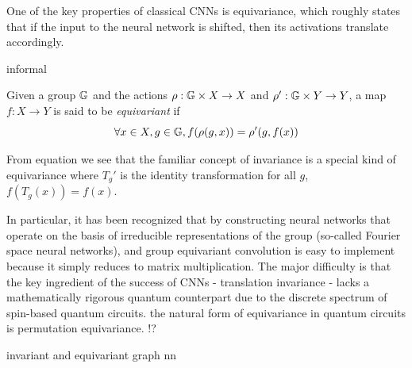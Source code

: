 One of the key properties of classical CNNs is equivariance, which roughly states that if the input to the neural network is shifted, then its activations translate accordingly. 
\cite{cohenGroupEquivariantConvolutional2016}
\cite{kondorCovariantCompositionalNetworks2018}
\begin{definition}[Covariant]
\end{definition}
\begin{definition}[Invariant]
	informal
\end{definition}
\begin{definition}[Equivariant]\label{def:equivariant}
	Given a group $\mathbb{G}$ and the actions $\rho: \mathbb{G} \times X\to X$ and $\rho': \mathbb{G} \times Y\to Y$,
	a map $f: X\to Y$ is said to be \emph{equivariant} if
	\begin{equation}
		\forall x\in X, g\in \mathbb{G},
		f(\rho(g,x)) = \rho'(g,f(x))
	\end{equation}
\end{definition}
From equation  we see that the familiar concept of invariance is a special kind of equivariance where $T_g'$ is the identity transformation for all $g$, $f(T_g(x))=f(x)$.
\begin{remark}
	In particular, it has been recognized that by constructing neural networks that operate on the basis of irreducible representations of the group (so-called Fourier space neural networks), and group equivariant convolution is easy to implement because it simply reduces to matrix multiplication.
	The major difficulty is that the key ingredient of the success of CNNs - translation invariance - lacks a mathematically rigorous quantum counterpart due to the discrete spectrum of spin-based quantum circuits.
	the natural form of equivariance in quantum circuits is permutation equivariance.
	\cite{zhengSpeedingLearningQuantum2022}!?
\end{remark}
invariant and equivariant graph nn
\cite{maronInvariantEquivariantGraph2019}

